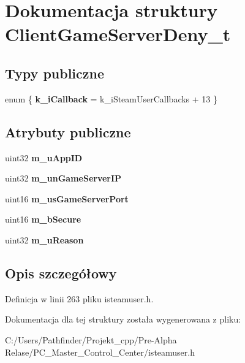 \hypertarget{struct_client_game_server_deny__t}{}\section{Dokumentacja struktury Client\+Game\+Server\+Deny\+\_\+t}
\label{struct_client_game_server_deny__t}
\subsection*{Typy publiczne}
\begin{DoxyCompactItemize}
\item 
\mbox{\label{struct_client_game_server_deny__t_a6ccb3982fee0d70ede6bc1077659eb74}} 
enum \{ {\bfseries k\+\_\+i\+Callback} = k\+\_\+i\+Steam\+User\+Callbacks + 13
 \}
\end{DoxyCompactItemize}
\subsection*{Atrybuty publiczne}
\begin{DoxyCompactItemize}
\item 
\mbox{\label{struct_client_game_server_deny__t_a05a3e512cb312822b32304fcf76f93ef}} 
uint32 {\bfseries m\+\_\+u\+App\+ID}
\item 
\mbox{\label{struct_client_game_server_deny__t_a36595fc514fb1465ce7fed234514ba69}} 
uint32 {\bfseries m\+\_\+un\+Game\+Server\+IP}
\item 
\mbox{\label{struct_client_game_server_deny__t_afadbe2993ae2464a40d24f82b1e9cfd1}} 
uint16 {\bfseries m\+\_\+us\+Game\+Server\+Port}
\item 
\mbox{\label{struct_client_game_server_deny__t_a924cb83dacac00b44b889e431c05902a}} 
uint16 {\bfseries m\+\_\+b\+Secure}
\item 
\mbox{\label{struct_client_game_server_deny__t_a2acb2645bc0ad581a27d053f4535915a}} 
uint32 {\bfseries m\+\_\+u\+Reason}
\end{DoxyCompactItemize}


\subsection{Opis szczegółowy}


Definicja w linii 263 pliku isteamuser.\+h.



Dokumentacja dla tej struktury została wygenerowana z pliku\+:\begin{DoxyCompactItemize}
\item 
C\+:/\+Users/\+Pathfinder/\+Projekt\+\_\+cpp/\+Pre-\/\+Alpha Relase/\+P\+C\+\_\+\+Master\+\_\+\+Control\+\_\+\+Center/isteamuser.\+h\end{DoxyCompactItemize}
